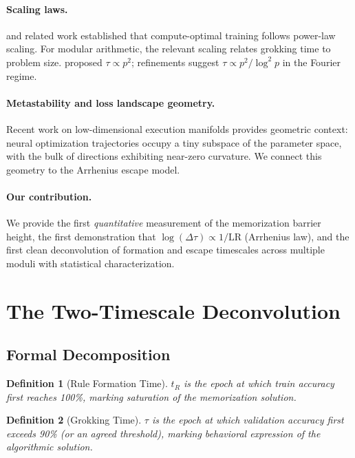 \documentclass[11pt,twocolumn]{article}
\newtheorem{definition}{Definition}
\begin{document}
\paragraph{Scaling laws.}
\citet{hoffmann2022training} and related work established that compute-optimal training follows power-law scaling. For modular arithmetic, the relevant scaling relates grokking time to problem size. \citet{noam2023grokking} proposed $\tau \propto p^2$; refinements suggest $\tau \propto p^2 / \log^2 p$ in the Fourier regime.

\paragraph{Metastability and loss landscape geometry.}
Recent work on low-dimensional execution manifolds \citep{gur2018gradient, fort2019goldilocks} provides geometric context: neural optimization trajectories occupy a tiny subspace of the parameter space, with the bulk of directions exhibiting near-zero curvature. We connect this geometry to the Arrhenius escape model.

\paragraph{Our contribution.}
We provide the first \emph{quantitative} measurement of the memorization barrier height, the first demonstration that $\log(\Delta\tau) \propto 1/\mathrm{LR}$ (Arrhenius law), and the first clean deconvolution of formation and escape timescales across multiple moduli with statistical characterization.

\section{The Two-Timescale Deconvolution}
\label{sec:deconvolution}

\subsection{Formal Decomposition}

\begin{definition}[Rule Formation Time]
$t_R$ is the epoch at which train accuracy first reaches 100\%, marking saturation of the memorization solution.
\end{definition}

\begin{definition}[Grokking Time]
$\tau$ is the epoch at which validation accuracy first exceeds 90\% (or an agreed threshold), marking behavioral expression of the algorithmic solution.
\end{definition}
\end{document}

